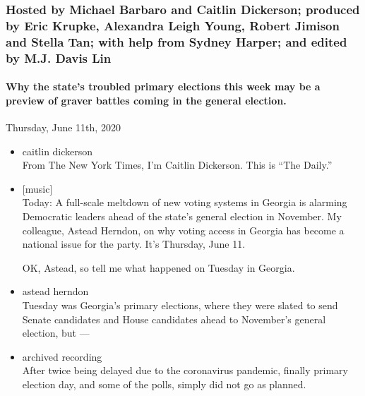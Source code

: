 \hypertarget{hosted-by-michael-barbaro-and-caitlin-dickerson-produced-by-eric-krupke-alexandra-leigh-young-robert-jimison-and-stella-tan-with-help-from-sydney-harper-and-edited-by-mj-davis-lin-1}{%
\subsubsection{Hosted by Michael Barbaro and Caitlin Dickerson; produced
by Eric Krupke, Alexandra Leigh Young, Robert Jimison and Stella Tan;
with help from Sydney Harper; and edited by M.J. Davis
Lin}\label{hosted-by-michael-barbaro-and-caitlin-dickerson-produced-by-eric-krupke-alexandra-leigh-young-robert-jimison-and-stella-tan-with-help-from-sydney-harper-and-edited-by-mj-davis-lin-1}}

\hypertarget{why-the-states-troubled-primary-elections-this-week-may-be-a-preview-of-graver-battles-coming-in-the-general-election-2}{%
\paragraph{Why the state's troubled primary elections this week may be a
preview of graver battles coming in the general
election.}\label{why-the-states-troubled-primary-elections-this-week-may-be-a-preview-of-graver-battles-coming-in-the-general-election-2}}

Thursday, June 11th, 2020

\begin{itemize}
\item
  caitlin dickerson\\
  From The New York Times, I'm Caitlin Dickerson. This is ``The Daily.''
\item
  {[}music{]}\\
  Today: A full-scale meltdown of new voting systems in Georgia is
  alarming Democratic leaders ahead of the state's general election in
  November. My colleague, Astead Herndon, on why voting access in
  Georgia has become a national issue for the party. It's Thursday, June
  11.

  OK, Astead, so tell me what happened on Tuesday in Georgia.
\item
  astead herndon\\
  Tuesday was Georgia's primary elections, where they were slated to
  send Senate candidates and House candidates ahead to November's
  general election, but ---
\item
  archived recording\\
  After twice being delayed due to the coronavirus pandemic, finally
  primary election day, and some of the polls, simply did not go as
  planned.
\end{itemize}

